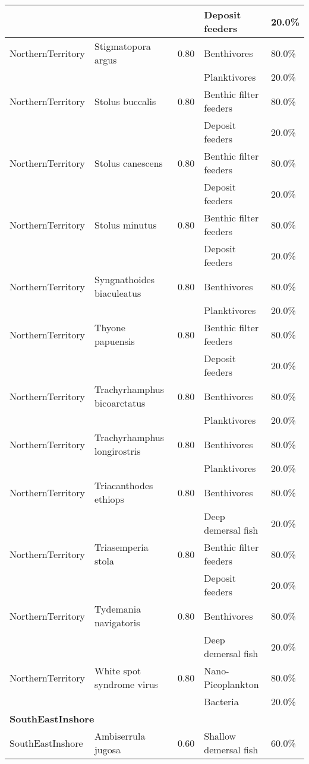 \begin{longtable}{llcll}
& & & Deposit feeders & 20.0\% \\
\hline
NorthernTerritory & Stigmatopora argus & 0.80 & Benthivores & 80.0\% \\
& & & Planktivores & 20.0\% \\
\hline
NorthernTerritory & Stolus buccalis & 0.80 & Benthic filter feeders & 80.0\% \\
& & & Deposit feeders & 20.0\% \\
\hline
NorthernTerritory & Stolus canescens & 0.80 & Benthic filter feeders & 80.0\% \\
& & & Deposit feeders & 20.0\% \\
\hline
NorthernTerritory & Stolus minutus & 0.80 & Benthic filter feeders & 80.0\% \\
& & & Deposit feeders & 20.0\% \\
\hline
NorthernTerritory & Syngnathoides biaculeatus & 0.80 & Benthivores & 80.0\% \\
& & & Planktivores & 20.0\% \\
\hline
NorthernTerritory & Thyone papuensis & 0.80 & Benthic filter feeders & 80.0\% \\
& & & Deposit feeders & 20.0\% \\
\hline
NorthernTerritory & Trachyrhamphus bicoarctatus & 0.80 & Benthivores & 80.0\% \\
& & & Planktivores & 20.0\% \\
\hline
NorthernTerritory & Trachyrhamphus longirostris & 0.80 & Benthivores & 80.0\% \\
& & & Planktivores & 20.0\% \\
\hline
NorthernTerritory & Triacanthodes ethiops & 0.80 & Benthivores & 80.0\% \\
& & & Deep demersal fish & 20.0\% \\
\hline
NorthernTerritory & Triasemperia stola & 0.80 & Benthic filter feeders & 80.0\% \\
& & & Deposit feeders & 20.0\% \\
\hline
NorthernTerritory & Tydemania navigatoris & 0.80 & Benthivores & 80.0\% \\
& & & Deep demersal fish & 20.0\% \\
\hline
NorthernTerritory & White spot syndrome virus & 0.80 & Nano-Picoplankton & 80.0\% \\
& & & Bacteria & 20.0\% \\
\hline
\hline
\multicolumn{5}{l}{\textbf{SouthEastInshore}} \\
\hline
SouthEastInshore & Ambiserrula jugosa & 0.60 & Shallow demersal fish & 60.0\% \\

\end{longtable}
